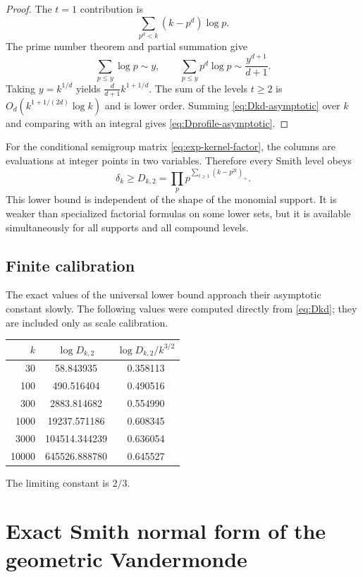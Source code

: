 \documentclass[11pt,oneside]{article}
\theoremstyle{definition}
\theoremstyle{remark}
\begin{document}
\begin{proof}
The $t=1$ contribution is
\[
 \sum_{p^d<k}(k-p^d)\log p.
\]
The prime number theorem and partial summation give
\[
 \sum_{p\le y}\log p\sim y,
 \qquad
 \sum_{p\le y}p^d\log p\sim\frac{y^{d+1}}{d+1}.
\]
Taking $y=k^{1/d}$ yields $\frac{d}{d+1}k^{1+1/d}$.  The sum of the levels $t\ge2$ is $O_d(k^{1+1/(2d)}\log k)$ and is lower order.  Summing \eqref{eq:Dkd-asymptotic} over $k$ and comparing with an integral gives \eqref{eq:Dprofile-asymptotic}.
\end{proof}

\begin{resultbox}
For the conditional semigroup matrix \eqref{eq:exp-kernel-factor}, the columns are evaluations at integer points in two variables.  Therefore every Smith level obeys
\[
 \delta_k\ge D_{k,2}
 =\prod_p p^{\sum_{t\ge1}(k-p^{2t})_+}.
\]
This lower bound is independent of the shape of the monomial support.  It is weaker than specialized factorial formulas on some lower sets, but it is available simultaneously for all supports and all compound levels.
\end{resultbox}

\subsection{Finite calibration}

The exact values of the universal lower bound approach their asymptotic constant slowly.  The following values were computed directly from \eqref{eq:Dkd}; they are included only as scale calibration.

\begin{center}
\begin{tabular}{rcc}
\toprule
$k$ & $\log D_{k,2}$ & $\log D_{k,2}/k^{3/2}$ \\
\midrule
30 & 58.843935 & 0.358113\\
100 & 490.516404 & 0.490516\\
300 & 2883.814682 & 0.554990\\
1000 & 19237.571186 & 0.608345\\
3000 & 104514.344239 & 0.636054\\
10000 & 645526.888780 & 0.645527\\
\bottomrule
\end{tabular}
\end{center}
The limiting constant is $2/3$.

\section{Exact Smith normal form of the geometric Vandermonde}
\label{sec:qvandermonde}
\end{document}
